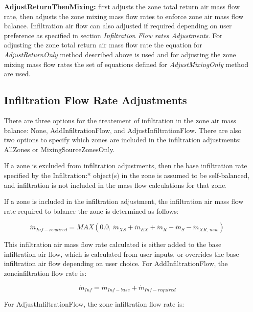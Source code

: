 \textbf{AdjustReturnThenMixing:} first adjusts the zone total return air mass flow rate, then adjusts the zone mixing mass flow rates to enforce zone air mass flow balance. Infiltration air flow can also adjusted if required depending on user preference as specified in section \textit{Infiltration Flow rates Adjustments}. For adjusting the zone total return air mass flow rate the equation for \textit{AdjustReturnOnly} method described above is used and for adjusting the zone mixing mass flow rates the set of equations defined for \textit{AdjustMixingOnly} method are used.

\subsection{Infiltration Flow Rate Adjustments}\label{infiltration-flow-rate-adjustments}

There are three options for the treatement of infiltration in the zone air mass balance: None, AddInfiltrationFlow, and AdjustInfiltrationFlow. There are also two options to specify which zones are included in the infiltration adjustments: AllZones or MixingSourceZonesOnly.

If a zone is excluded from infiltration adjustments, then the base infiltration rate specified by the Infiltration:* object(s) in the zone is assumed to be self-balanced, and infiltration is not included in the mass flow calculations for that zone.

If a zone is included in the infiltration adjustment, the infiltration air mass flow rate required to balance the zone is determined as follows:

\begin{equation}
{\dot m_{Inf-required}} = MAX\left( {0.0,\,{{\dot m}_{XS}} + {{\dot m}_{EX}} + {{\dot m}_{R}} - {{\dot m}_S}  - {\dot m_{XR,\,new}}} \right)
\end{equation}

This infiltration air mass flow rate calculated is either added to the base infiltration air flow, which is calculated from user inputs, or overrides the base infiltration air flow depending on user choice. For AddInfiltrationFlow, the zoneinfiltration flow rate is:

\begin{equation}
{\dot m_{Inf}} = {\dot m_{Inf-base}} + {\dot m_{Inf-required}}
\end{equation}

For AdjustInfiltrationFlow, the zone infiltration flow rate is:

